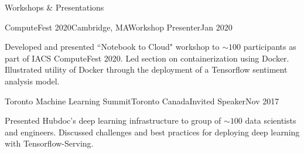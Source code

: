 \documentclass{resume} %
\begin{document}
\begin{rSection}{Workshops \& Presentations}

\begin{rSubsection}{ComputeFest 2020}{Cambridge, MA}{Workshop Presenter}{Jan 2020}

\item Developed and presented ``Notebook to Cloud" workshop to $\sim 100$ participants as part of IACS ComputeFest 2020. Led section on containerization using Docker. Illustrated utility of Docker through the deployment of a Tensorflow sentiment analysis model.

\end{rSubsection}

\begin{rSubsection}{Toronto Machine Learning Summit}{Toronto Canada}{Invited Speaker}{Nov 2017}

\item Presented Hubdoc's deep learning infrastructure to group of $\sim 100$ data scientists and engineers. Discussed challenges and best practices for deploying deep learning with Tensorflow-Serving.

\end{rSubsection}

\end{rSection}
\end{document}
